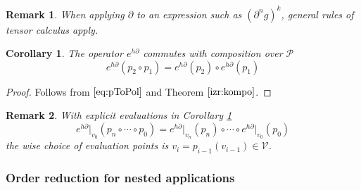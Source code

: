 \documentclass[preprint,12pt]{elsarticle}
\newcommand{\VV}{\mathcal{V}}
\newcommand{\dP}{\mathcal{P}}
\newcommand{\D}{\partial}
\newtheorem{opomba}{Remark}[section]
\newtheorem{corollary}{Corollary}[section]
\begin{document}
 \begin{opomba}
 When applying $\D$ to an expression such as $(\D^n g)^k$, general rules of tensor calculus apply. 
 \end{opomba}
 
   \begin{corollary}\label{izr:komp_homo}
   The operator $e^{h\D}$ commutes with composition over $\dP$
   \begin{equation}
   e^{h\D}(p_2\circ p_1)=e^{h\D}(p_2)\circ e^{h\D}(p_1)
   \end{equation}
   \end{corollary}
   
   \begin{proof}
   Follows from $\eqref{eq:pToPol}$ and Theorem $\ref{izr:kompo}$.
   \end{proof}
   
   \begin{opomba}
   With explicit evaluations in Corollary \ref{izr:komp_homo}
   \begin{equation}
   e^{h\D}\vert_{v_0}(p_n\circ\cdots\circ p_0)=e^{h\D}\vert_{v_n}(p_n)\circ\cdots\circ e^{h\D}\vert_{v_0}(p_0)
   \end{equation}
   the wise choice of evaluation points is $v_{i}=p_{i-1}(v_{i-1})\in \VV$.
   \end{opomba}
 
 \subsubsection{Order reduction for nested applications}\label{sec:orderReduction}
 
\end{document}
